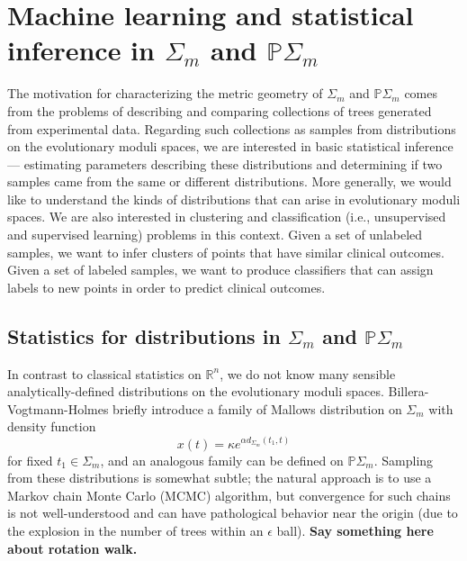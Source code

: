 \documentclass[a4paper,11pt]{article}
\begin{document}

\section{Machine learning and statistical inference in $\Sigma_m$ and $\mathbb{P}\Sigma_m$}\label{sec:ML}

The motivation for characterizing the metric geometry of $\Sigma_m$ and $\mathbb{P}\Sigma_m$ comes from the problems of describing and comparing collections of trees generated from experimental data.
Regarding such collections as samples from distributions on the evolutionary moduli spaces, we are interested in basic statistical inference --- estimating parameters describing these distributions and determining if two samples came from the same or different distributions.
More generally, we would like to understand the kinds of distributions that can arise in evolutionary moduli spaces.
We are also interested in clustering and classification (i.e., unsupervised and supervised learning) problems in this context.
Given a set of unlabeled samples, we want to infer clusters of points that have similar clinical outcomes.
Given a set of labeled samples, we want to produce classifiers that can assign labels to new points in order to predict clinical outcomes.

\subsection{Statistics for distributions in $\Sigma_m$ and $\mathbb{P}\Sigma_m$}

In contrast to classical statistics on $\mathbb{R}^n$, we do not know many sensible analytically-defined distributions on the evolutionary moduli spaces.
Billera-Vogtmann-Holmes briefly introduce a family of Mallows distribution on $\Sigma_m$ with density function
\[
x(t) = \kappa e^{\alpha d_{\Sigma_m}(t_1, t)}
\] 
for fixed $t_1 \in \Sigma_m$, and an analogous family can be defined on $\mathbb{P}\Sigma_m$.
Sampling from these distributions is somewhat subtle; the natural approach is to use a Markov chain Monte Carlo (MCMC) algorithm, but convergence for such chains is not well-understood and can have pathological behavior near the origin (due to the explosion in the number of trees within an $\epsilon$ ball).
{\bf Say something here about rotation walk.}
\end{document}
